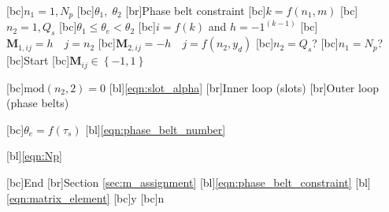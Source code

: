 \begin{psfrags}%
\psfragscanon

[bc]{$n_1 = 1,N_p$}
[bc]{$\theta_1, \; \theta_2$}
[br]{Phase belt constraint}
[bc]{$k=f(n_1,m)$}
[bc]{$n_2 = 1,Q_s$}
[bc]{$\theta_1 \leq \theta_e < \theta_2$}
[bc]{$i=f(k)$ and $h=-1^{(k-1)}$}
[bc]{$\mathbf{M}_{1,ij}=h \quad j=n_2$}
[bc]{$\mathbf{M}_{2,ij}=-h \quad j=f(n_2,y_d)$}
[bc]{$n_2=Q_s$?}
[bc]{$n_1=N_p$?}
[bc]{Start}
[bc]{$\mathbf{M}_{ij} \in \left\{-1,1\right\}$}

[bc]{$\mbox{mod}(n_2,2)=0$}
[bl]{\eqref{eqn:slot_alpha}}
[br]{Inner loop (slots)}
[br]{Outer loop (phase belts)}

[bc]{$\theta_e = f(\tau_s)$}
[bl]{\eqref{eqn:phase_belt_number}}

[bl]{\eqref{eqn:Np}}

[bc]{End}
[br]{Section \ref{sec:m_assignment}}
[bl]{\eqref{eqn:phase_belt_constraint}}
[bl]{\eqref{eqn:matrix_element}}
[bc]{y}
[bc]{n}


\end{psfrags}
